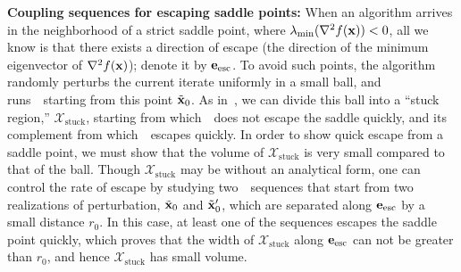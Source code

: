 \textbf{Coupling sequences for escaping saddle points:} When an algorithm arrives in the neighborhood of a strict saddle point, where $\lambda_{\min}(\nabla^2 f(\mathbf{x})) <0$, all we know is that there exists a direction of
escape (the direction of the minimum eigenvector of $\nabla^2 f(\mathbf{x})$); denote it by $\mathbf{e}_{\text{esc}}$. To avoid such points, the algorithm randomly perturbs the current iterate uniformly in a small ball, and runs~\nag~starting from this point $\tilde{\mathbf{x}}_0$. %
As in~\cite{jin2017escape}, we can divide this ball into a ``stuck region,'' 
$\mathcal{X}_{\text{stuck}}$, starting from which~\nag~does not escape the saddle 
quickly, and its complement from which~\nag~escapes quickly. In order to show 
quick escape from a saddle point, we must show that the volume of $\mathcal{X}_{\text{stuck}}$ 
is very small compared to that of the ball. Though $\mathcal{X}_{\text{stuck}}$ may 
be without an analytical form, one can control the rate of escape by studying 
two~\nag~sequences that start from two realizations of perturbation, $\tilde{\mathbf{x}}_0$ and $\tilde{\mathbf{x}}'_0$, 
which are separated along $\mathbf{e}_{\text{esc}}$ by a small distance $r_0$. In this case, 
at least one of the sequences escapes the saddle point quickly, which proves that the 
width of $\mathcal{X}_{\text{stuck}}$ along $\mathbf{e}_{\text{esc}}$ can not be greater than 
$r_0$, and hence $\mathcal{X}_{\text{stuck}}$ has small volume.












